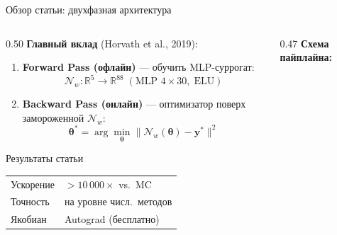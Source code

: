 \documentclass[11pt, aspectratio=169]{beamer}
\begin{document}
\begin{frame}[shrink=5]{Обзор статьи: двухфазная архитектура}
  \begin{columns}[T]
    \begin{column}{0.50\textwidth}
      \textbf{Главный вклад} (Horvath et al., 2019):
      \medskip
      \begin{enumerate}\small
        \item \textbf{Forward Pass (офлайн)} — обучить MLP-суррогат:
              \[
                \mathcal{N}_w:\mathbb{R}^5\!\to\!\mathbb{R}^{88}
                \;(\text{MLP }4{\times}30,\;\text{ELU})
              \]
        \item \textbf{Backward Pass (онлайн)} — оптимизатор
              поверх замороженной $\mathcal{N}_w$:
              \[
                \boldsymbol\theta^*=\arg\min_{\boldsymbol\theta}
                \|\mathcal{N}_w(\boldsymbol\theta)-\mathbf{y}^*\|^2
              \]
      \end{enumerate}

      \medskip
      \begin{block}{Результаты статьи}
        \small
        \begin{tabular}{@{}ll@{}}
          Ускорение & $>10\,000\times$ vs.\ MC \\
          Точность  & на уровне числ.\ методов \\
          Якобиан   & Autograd (бесплатно) \\
        \end{tabular}
      \end{block}
    \end{column}

    \begin{column}{0.47\textwidth}
      \textbf{Схема пайплайна:}
      \medskip
      \begin{center}
\end{center}
\end{column}
\end{columns}
\end{frame}
\end{document}
